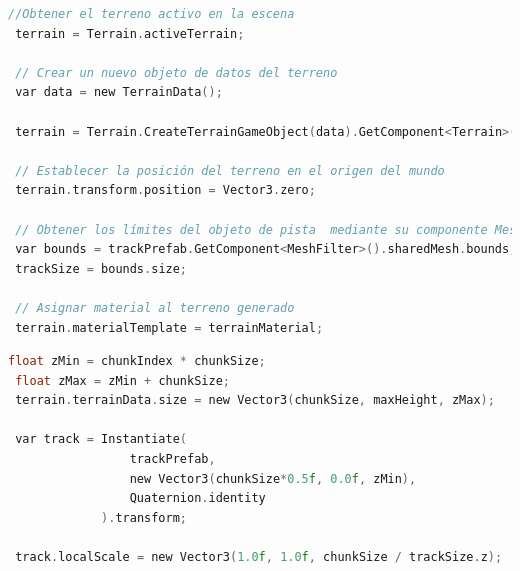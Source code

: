 \begin{center}
\begin{minipage}{0.8\textwidth}
\begin{lstlisting}[language=c, caption={Generar terreno},label={hola}]
 //Obtener el terreno activo en la escena
 terrain = Terrain.activeTerrain;
 
 // Crear un nuevo objeto de datos del terreno
 var data = new TerrainData();

 terrain = Terrain.CreateTerrainGameObject(data).GetComponent<Terrain>();
 
 // Establecer la posición del terreno en el origen del mundo
 terrain.transform.position = Vector3.zero;     

 // Obtener los límites del objeto de pista  mediante su componente MeshFilter           
 var bounds = trackPrefab.GetComponent<MeshFilter>().sharedMesh.bounds;
 trackSize = bounds.size;
 
 // Asignar material al terreno generado
 terrain.materialTemplate = terrainMaterial;
\end{lstlisting}
\end{minipage}  
\end{center}

\begin{center}
\begin{minipage}{0.8\textwidth}
\begin{lstlisting}[language=c, caption={Generar pista}]
 float zMin = chunkIndex * chunkSize;
 float zMax = zMin + chunkSize;
 terrain.terrainData.size = new Vector3(chunkSize, maxHeight, zMax);

 var track = Instantiate(
                 trackPrefab, 
                 new Vector3(chunkSize*0.5f, 0.0f, zMin), 
                 Quaternion.identity
             ).transform;

 track.localScale = new Vector3(1.0f, 1.0f, chunkSize / trackSize.z);
\end{lstlisting}
\end{minipage}  
\end{center}

